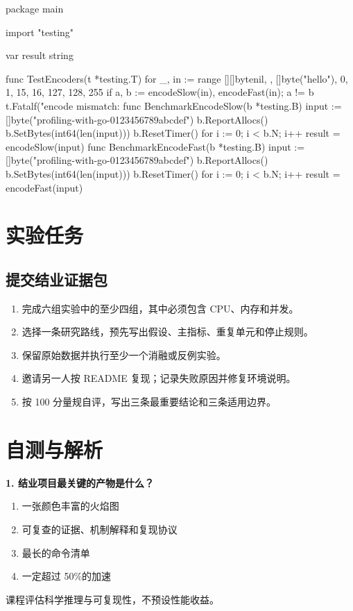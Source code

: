 \documentclass[UTF8,fontset=fandol,openany,11pt]{ctexbook}
\begin{document}
\begin{codeblock}
package main

import "testing"

var result string

func TestEncoders(t *testing.T) {
	for _, in := range [][]byte{nil, {}, []byte("hello"), {0, 1, 15, 16, 127, 128, 255}} {
		if a, b := encodeSlow(in), encodeFast(in); a != b {
			t.Fatalf("encode mismatch: %
		}
	}
}
func BenchmarkEncodeSlow(b *testing.B) {
	input := []byte("profiling-with-go-0123456789abcdef")
	b.ReportAllocs()
	b.SetBytes(int64(len(input)))
	b.ResetTimer()
	for i := 0; i < b.N; i++ {
		result = encodeSlow(input)
	}
}
func BenchmarkEncodeFast(b *testing.B) {
	input := []byte("profiling-with-go-0123456789abcdef")
	b.ReportAllocs()
	b.SetBytes(int64(len(input)))
	b.ResetTimer()
	for i := 0; i < b.N; i++ {
		result = encodeFast(input)
	}
}
\end{codeblock}

\section{实验任务}
\subsection*{提交结业证据包}
\begin{enumerate}
\item 完成六组实验中的至少四组，其中必须包含 CPU、内存和并发。

\item 选择一条研究路线，预先写出假设、主指标、重复单元和停止规则。

\item 保留原始数据并执行至少一个消融或反例实验。

\item 邀请另一人按 README 复现；记录失败原因并修复环境说明。

\item 按 100 分量规自评，写出三条最重要结论和三条适用边界。

\end{enumerate}
\section{自测与解析}
\noindent\textbf{1. 结业项目最关键的产物是什么？}
\begin{enumerate}[label=\Alph*.]
\item 一张颜色丰富的火焰图
\item 可复查的证据、机制解释和复现协议
\item 最长的命令清单
\item 一定超过 50\%的加速
\end{enumerate}
课程评估科学推理与可复现性，不预设性能收益。
\end{document}

